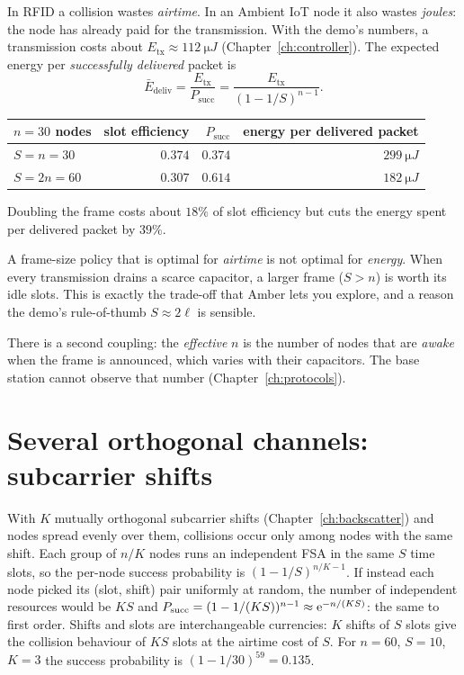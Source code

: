 In RFID a collision wastes \emph{airtime}. In an Ambient IoT node it also wastes \emph{joules}:
the node has already paid for the transmission. With the demo's numbers, a transmission
costs about $E_{\mathrm{tx}}\approx\SI{112}{\micro J}$ (Chapter~\ref{ch:controller}). The expected energy per \emph{successfully delivered} packet is
\begin{equation}
 \bar E_{\mathrm{deliv}}=\frac{E_{\mathrm{tx}}}{P_{\mathrm{succ}}}=\frac{E_{\mathrm{tx}}}{(1-1/S)^{n-1}}.
\end{equation}
\begin{center}
\small
\renewcommand{\arraystretch}{1.1}
\begin{tabular}{@{}lrrr@{}}
\toprule
$n=30$ nodes & slot efficiency & $P_{\mathrm{succ}}$ & energy per delivered packet\\
\midrule
$S=n=30$ & $0.374$ & $0.374$ & $\SI{299}{\micro J}$\\
$S=2n=60$ & $0.307$ & $0.614$ & $\SI{182}{\micro J}$\\
\bottomrule
\end{tabular}
\end{center}
Doubling the frame costs about $18\%$ of slot efficiency but cuts the energy spent per delivered packet by $39\%$.
\begin{keyidea}
A frame-size policy that is optimal for \emph{airtime} is not optimal for \emph{energy}. When every transmission
drains a scarce capacitor, a larger frame ($S>n$) is worth its idle slots. This is exactly the trade-off that Amber lets you explore, and a reason the
demo's rule-of-thumb $S\approx2\ell$ is sensible.
\end{keyidea}
There is a second coupling: the \emph{effective} $n$ is the number of nodes that are \emph{awake} when the frame is announced, which varies with their capacitors. The base station cannot observe that number (Chapter~\ref{ch:protocols}).

\section{Several orthogonal channels: subcarrier shifts}

With $K$ mutually orthogonal subcarrier shifts (Chapter~\ref{ch:backscatter}) and nodes spread evenly over them, collisions occur only among nodes with the same shift. Each group of
$n/K$ nodes runs an independent FSA in the same $S$ time slots, so the per-node success probability is $(1-1/S)^{n/K-1}$. If instead each node picked its
(slot, shift) pair uniformly at random, the number of independent resources would be $KS$ and
$P_{\mathrm{succ}}=(1-1/(KS))^{n-1}\approx\mathrm{e}^{-n/(KS)}$: the same to first order. Shifts and slots are
interchangeable currencies: $K$ shifts of $S$ slots give the collision behaviour of $KS$ slots at the
airtime cost of $S$. For $n=60$, $S=10$, $K=3$ the success probability is $(1-1/30)^{59}=0.135$.

